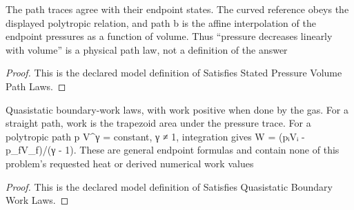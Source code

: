 \begin{definition}
  \label{def:physics:phyx-mini-0356:phyxminiproblems-problemphyxmini0356-satisfiesstatedpressurevolumepathlaws}
  The path traces agree with their endpoint states. The curved reference obeys the displayed polytropic relation, and path b is the affine interpolation of the endpoint pressures as a function of volume. Thus “pressure decreases linearly with volume” is a physical path law, not a definition of the answer
\end{definition}
\begin{proof}
  This is the declared model definition of Satisfies Stated Pressure Volume Path Laws.
\end{proof}
\begin{definition}
  \label{def:physics:phyx-mini-0356:phyxminiproblems-problemphyxmini0356-satisfiesquasistaticboundaryworklaws}
  Quasistatic boundary-work laws, with work positive when done by the gas. For a straight path, work is the trapezoid area under the pressure trace. For a polytropic path p V\textasciicircum{}γ = constant, γ ≠ 1, integration gives W = (pᵢVᵢ - p\_fV\_f)/(γ - 1). These are general endpoint formulas and contain none of this problem's requested heat or derived numerical work values
\end{definition}
\begin{proof}
  This is the declared model definition of Satisfies Quasistatic Boundary Work Laws.
\end{proof}
